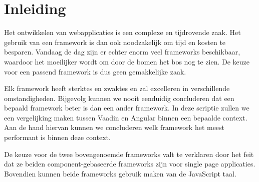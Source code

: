 
\chapter{Inleiding}
\label{ch:inleiding}

Het ontwikkelen van webapplicaties is een complexe en tijdrovende zaak. Het gebruik van een framework is dan ook noodzakelijk om tijd en kosten te besparen. Vandaag de dag zijn er echter enorm veel frameworks beschikbaar, waardoor het moeilijker wordt om door de bomen het bos nog te zien. De keuze voor een passend framework is dus geen gemakkelijke zaak. 

Elk framework heeft sterktes en zwaktes en zal excelleren in verschillende omstandigheden. Bijgevolg kunnen we nooit eenduidig concluderen dat een bepaald framework beter is dan een ander framework. In deze scriptie zullen we een vergelijking maken tussen Vaadin en Angular binnen een bepaalde context. Aan de hand hiervan kunnen we concluderen welk framework het meest performant is binnen deze context. 

De keuze voor de twee bovengenoemde frameworks valt te verklaren door het feit dat ze beiden component-gebaseerde frameworks zijn voor single page applicaties. Bovendien kunnen beide frameworks gebruik maken van de JavaScript taal. 

\iffalse
De inleiding moet de lezer net genoeg informatie verschaffen om het onderwerp te begrijpen en in te zien waarom de onderzoeksvraag de moeite waard is om te onderzoeken. In de inleiding ga je literatuurverwijzingen beperken, zodat de tekst vlot leesbaar blijft. Je kan de inleiding verder onderverdelen in secties als dit de tekst verduidelijkt. Zaken die aan bod kunnen komen in de inleiding~\autocite{Pollefliet2011}:

\begin{itemize}
  \item context, achtergrond
  \item afbakenen van het onderwerp
  \item verantwoording van het onderwerp, methodologie
  \item probleemstelling
  \item onderzoeksdoelstelling
  \item onderzoeksvraag
  \item \ldots
\end{itemize}
\fi

